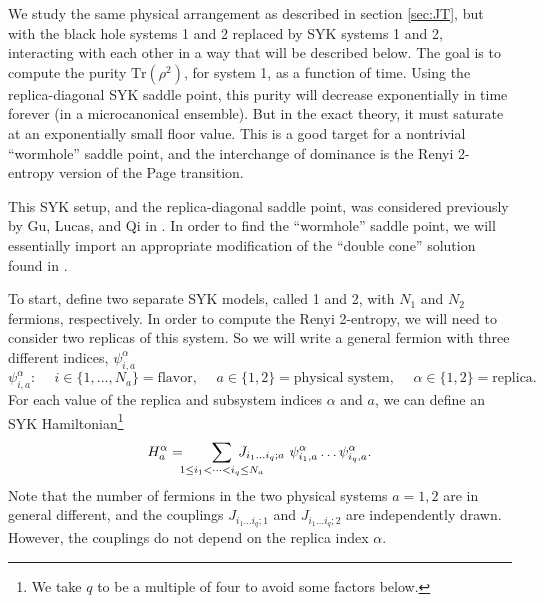 \documentclass[12pt]{article}
\newcommand{\be}{\begin{equation}}
\newcommand{\ee}{\end{equation}}
\numberwithin{equation}{section}
\def\tr{\text{Tr}}
\begin{document}
We study the same physical arrangement as described in section \ref{sec:JT}, but with the black hole systems 1 and 2 replaced by SYK systems 1 and 2, interacting with each other in a way that will be described below. The goal is to compute the purity $\tr (\rho^2)$, for system 1, as a function of time. Using the replica-diagonal SYK saddle point, this purity will decrease exponentially in time forever (in a microcanonical ensemble). But in the exact theory, it must saturate at an exponentially small floor value. This is a good target for a nontrivial ``wormhole'' saddle point, and the interchange of dominance is the Renyi 2-entropy version of the Page transition.

This SYK setup, and the replica-diagonal saddle point, was considered previously by Gu, Lucas, and Qi in \cite{Gu:2017njx}. In order to find the ``wormhole'' saddle point, we will essentially import an appropriate modification of the ``double cone'' solution found in \cite{Saad:2018bqo}. 

To start, define two separate SYK models, called 1 and 2, with $N_1$ and $N_2$ fermions, respectively. In order to compute the Renyi 2-entropy, we will need to consider two replicas of this system. So we will write a general fermion with three different indices, $\psi_{i,a}^\alpha$
\be
\psi_{i,a}^\alpha: \hspace{15pt} i \in \{1,\dots,N_a\} = \text{flavor}, \hspace{15pt} a \in \{1,2\} = \text{physical system}, \hspace{15pt} \alpha \in \{1,2\} = \text{replica}.
\ee
For each value of the replica and subsystem indices $\alpha$ and $a$, we can define an SYK Hamiltonian\footnote{We take $q$ to be a multiple of four to avoid some factors below.}
\be
H_a^\alpha = \hspace{-5pt}\sum_{1\le i_1<\dots <i_q\le N_a}\hspace{-20pt}J_{i_1\dots i_q;a} \ \psi_{i_1,a}^\alpha\dots \psi_{i_q,a}^\alpha.
\ee
Note that the number of fermions in the two physical systems $a = 1,2$ are in general different, and the couplings $J_{i_1\dots i_q;1}$ and $J_{i_1\dots i_q;2}$ are independently drawn. However, the couplings do not depend on the replica index $\alpha$.
\end{document}
